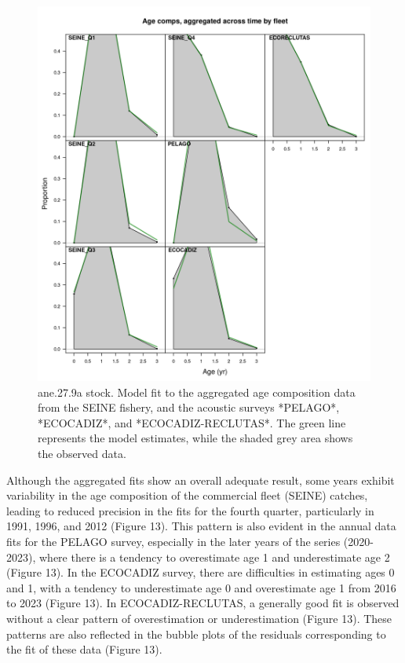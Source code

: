 \documentclass[
]{article}
\begin{document}
\begin{figure}[H]

{\centering \includegraphics[width=0.95\linewidth]{report/run/S1.0_4FLEETS/fig_age_fit_agg} 

}

\caption{ane.27.9a stock. Model fit to the aggregated age composition data from the SEINE fishery, and the acoustic surveys *PELAGO*, *ECOCADIZ*, and *ECOCADIZ-RECLUTAS*. The green line represents the model estimates, while the shaded grey area shows the observed data.}\label{fig:unnamed-chunk-18}
\end{figure}

Although the aggregated fits show an overall adequate result, some years
exhibit variability in the age composition of the commercial fleet
(SEINE) catches, leading to reduced precision in the fits for the fourth
quarter, particularly in 1991, 1996, and 2012 (Figure 13). This pattern
is also evident in the annual data fits for the PELAGO survey,
especially in the later years of the series (2020-2023), where there is
a tendency to overestimate age 1 and underestimate age 2 (Figure 13). In
the ECOCADIZ survey, there are difficulties in estimating ages 0 and 1,
with a tendency to underestimate age 0 and overestimate age 1 from 2016
to 2023 (Figure 13). In ECOCADIZ-RECLUTAS, a generally good fit is
observed without a clear pattern of overestimation or underestimation
(Figure 13). These patterns are also reflected in the bubble plots of
the residuals corresponding to the fit of these data (Figure 13).
\end{document}
